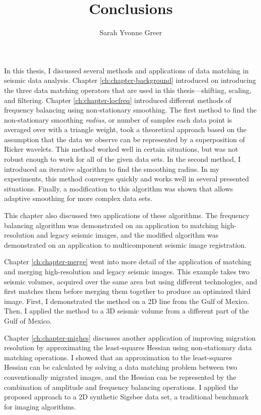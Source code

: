 \title{Conclusions}
\author{Sarah Yvonne Greer}
\label{ch:chapter-conclusion}

\maketitle


In this thesis, I discussed several methods and applications of data matching in seismic data analysis.
Chapter \ref{ch:chapter-background} introduced on introducing the three data matching operators that are used in this thesis---shifting, scaling, and filtering.
Chapter \ref{ch:chapter-locfreq} introduced different methods of frequency balancing using non-stationary smoothing. 
The first method to find the non-stationary smoothing {\em radius}, or number of samples each data point is averaged over with a triangle weight, took a theoretical approach based on the assumption that the data we observe can be represented by a superposition of Ricker wavelets.
This method worked well in certain situations, but was not robust enough to work for all of the given data sets.
In the second method, I introduced an iterative algorithm to find the smoothing radius. 
In my experiments, this method converges quickly and works well in several presented situations. 
Finally, a modification to this algorithm was shown that allows adaptive smoothing for more complex data sets.

This chapter also discussed two applications of these algorithms.
The frequency balancing algorithm was demonstrated on an application to matching high-resolution and legacy seismic images, and the modified algorithm was demonstrated on an application to multicomponent seismic image registration.

Chapter \ref{ch:chapter-merge} went into more detail of the application of matching and merging high-resolution and legacy seismic images.
This example takes two seismic volumes, acquired over the same area but using different technologies, and first matches them before merging them together to produce an optimized third image.
First, I demonstrated the method on a 2D line from the Gulf of Mexico.
Then, I applied the method to a 3D seismic volume from a different part of the Gulf of Mexico.

Chapter \ref{ch:chapter-mighes} discusses another application of improving migration resolution by approximating the least-squares Hessian using non-stationary data matching operations.
I showed that an approximation to the least-squares Hessian can be calculated by solving a data matching problem between two conventionally migrated images, and the Hessian can be represented by the combination of amplitude and frequency balancing operations.
I applied the proposed approach to a 2D synthetic Sigsbee data set, a traditional benchmark for imaging algorithms.


